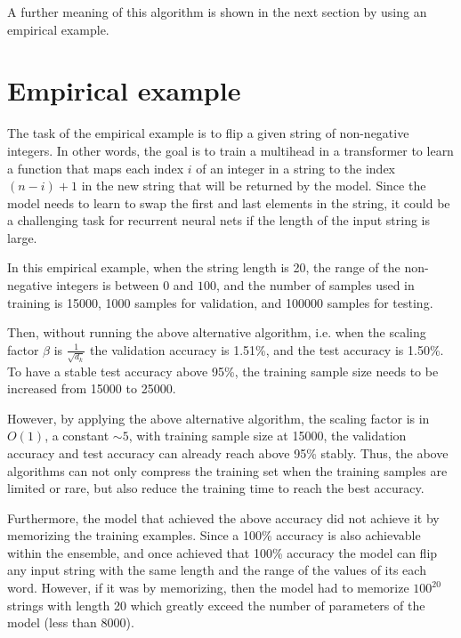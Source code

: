\documentclass{article}
\theoremstyle{plain}
\theoremstyle{plain} %
\theoremstyle{definition}  %
\theoremstyle{remark}  %
\theoremstyle{plain}
\begin{document}
A further meaning of this algorithm is shown in the next section by using an empirical example.


\section{Empirical example}

The task of the empirical example is to flip a given string of non-negative integers. In other words, the goal is to train a multihead in a transformer to learn a function that maps each index $i$ of an integer in a string to the index $(n-i)+1$ in the new string that will be returned by the model. Since the model needs to learn to swap the first and last elements in the string, it could be a challenging task for recurrent neural nets if the length of the input string is large.

In this empirical example, when the string length is 20, the range of the non-negative integers is between $0$ and $100$, and the number of samples used in training is 15000, 1000 samples for validation, and 100000 samples for testing. 

Then, without running the above alternative algorithm, i.e. when the scaling factor $\beta$ is $\frac{1}{\sqrt{d_k}}$ the validation accuracy is 1.51\%, and the test accuracy is 1.50\%. To have a stable test accuracy above 95\%, the training sample size needs to be increased from 15000 to 25000.

However, by applying the above alternative algorithm, the scaling factor is in $O(1)$, a constant $\sim 5$, with training sample size at 15000, the validation accuracy and test accuracy can already reach above 95\% stably. Thus, the above algorithms can not only compress the training set when the training samples are limited or rare, but also reduce the training time to reach the best accuracy.

Furthermore, the model that achieved the above accuracy did not achieve it by memorizing the training examples. Since a 100\% accuracy is also achievable within the ensemble, and once achieved that 100\% accuracy the model can flip any input string with the same length and the range of the values of its each word. However, if it was by memorizing, then the model had to memorize $100^{20}$ strings with length 20 which greatly exceed the number of parameters of the model (less than 8000).
\end{document}
